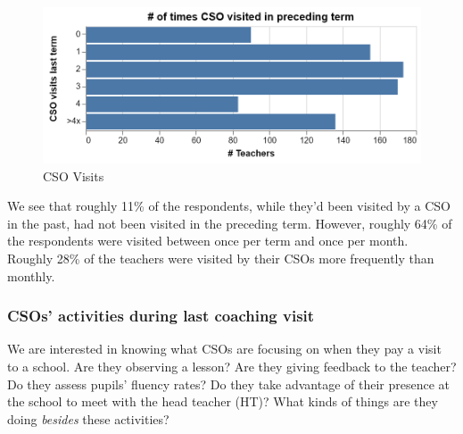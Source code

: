 \documentclass[11pt]{article}
\makeatletter
\def\maxwidth{\ifdim\Gin@nat@width>\linewidth\linewidth
    \else\Gin@nat@width\fi}
\let\Oldincludegraphics\includegraphics
\renewcommand{\includegraphics}[1]{\Oldincludegraphics[width=.8\maxwidth]{#1}}
\makeatother
\begin{document}
    \begin{figure}
\centering
\includegraphics{../img/csovisct_ch.png}
\caption{CSO Visits}
\end{figure}

    We see that roughly 11\% of the respondents, while they'd been visited
by a CSO in the past, had not been visited in the preceding term.
However, roughly 64\% of the respondents were visited between once per
term and once per month. Roughly 28\% of the teachers were visited by
their CSOs more frequently than monthly.

    \hypertarget{csos-activities-during-last-coaching-visit}{%
\subsubsection{CSOs' activities during last coaching
visit}\label{csos-activities-during-last-coaching-visit}}

We are interested in knowing what CSOs are focusing on when they pay a
visit to a school. Are they observing a lesson? Are they giving feedback
to the teacher? Do they assess pupils' fluency rates? Do they take
advantage of their presence at the school to meet with the head teacher
(HT)? What kinds of things are they doing \emph{besides} these
activities?
\end{document}
